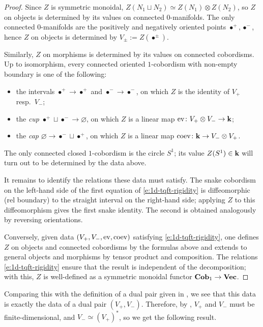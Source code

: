 \begin{proof}
  Since $Z$ is symmetric monoidal,
  $Z(N_1\sqcup N_2)\simeq Z(N_1)\otimes Z(N_2)$, so $Z$ on objects is determined
  by its values on connected 0-manifolds. The only connected 0-manifolds are the
  positively and negatively oriented points $\bullet^+, \bullet^-$, hence $Z$ on
  objects is determined by $V_\pm := Z(\bullet^\pm)$.

  Similarly, $Z$ on morphisms is determined by its values on connected
  cobordisms. Up to isomorphism, every connected oriented $1$-cobordism with
  non-empty boundary is one of the following:
  \begin{itemize}
    \item the intervals $\bullet^+\to\bullet^+$ and $\bullet^-\to\bullet^-$,
      on which $Z$ is the identity of $V_+$ resp.\ $V_-$;
    \item the \emph{cup}
      $\bullet^+\sqcup\bullet^-\to\varnothing$, on which $Z$ is a linear
      map $\operatorname{ev}\colon V_+\otimes V_-\to\mathbf{k}$;
    \item the \emph{cap}
      $\varnothing\to\bullet^-\sqcup\bullet^+$, on which $Z$ is a linear
      map $\operatorname{coev}\colon \mathbf{k}\to V_-\otimes V_+$.
  \end{itemize}
  The only connected closed $1$-cobordism is the circle $S^1$; its value
  $Z(S^1)\in\mathbf{k}$ will turn out to be determined by the data above.

  It remains to identify the relations these data must satisfy. The snake
  cobordism on the left-hand side of the first equation of
  \eqref{e:1d-tqft-rigidity} is diffeomorphic (rel boundary) to the straight
  interval on the right-hand side; applying $Z$ to this diffeomorphism gives
  the first snake identity. The second is obtained analogously by reversing
  orientations.

  Conversely, given data $(V_+, V_-, \operatorname{ev}, \operatorname{coev})$ satisfying
  \eqref{e:1d-tqft-rigidity}, one defines $Z$ on objects and connected
  cobordisms by the formulas above and extends to general objects and
  morphisms by tensor product and composition. The relations
  \eqref{e:1d-tqft-rigidity} ensure that the result is independent of the
  decomposition; with this, $Z$ is well-defined as a symmetric monoidal
  functor $\mathbf{Cob}_1\to\mathbf{Vec}$.
\end{proof}

Comparing this with the definition of a dual pair given in , we
see that this data is exactly the data of a dual pair $(V_+, V_-)$. Therefore,
by , $V_+$ and $V_-$ must be finite-dimensional, and
$V_-\simeq (V_+)^*$, so we get the following result.

